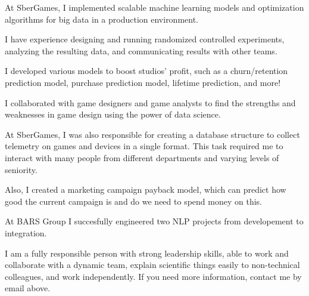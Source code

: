 \documentclass[11pt, a4paper]{awesome-cv}
\begin{document}
\begin{cvletter}
\begin{cvitems}
  \item {At SberGames, I implemented scalable machine learning models and optimization algorithms for big data in a production environment.}
  \item {I have experience designing and running randomized controlled experiments, analyzing the resulting data, and communicating results with other teams.}
  \item {I developed various models to boost studios' profit, such as a churn/retention prediction model, purchase prediction model, lifetime prediction, and more!}
  \item {I collaborated with game designers and game analysts to find the strengths and weaknesses in game design using the power of data science.}
  \item {At SberGames, I was also responsible for creating a database structure to collect telemetry on games and devices in a single format. This task required me to interact with many people from different departments and varying levels of seniority.}
  \item {Also, I created a marketing campaign payback model, which can predict how good the current campaign is and do we need to spend money on this.}
  \item {At BARS Group I succesfully engineered two NLP projects from developement to integration.}
  
\end{cvitems}
\bigskip


I am a fully responsible person with strong leadership skills, able to work and collaborate with a dynamic team, explain scientific things easily to non-technical colleagues, and work independently. If you need more information, contact me by email above.

\end{cvletter}


\makeletterclosing
\end{document}
